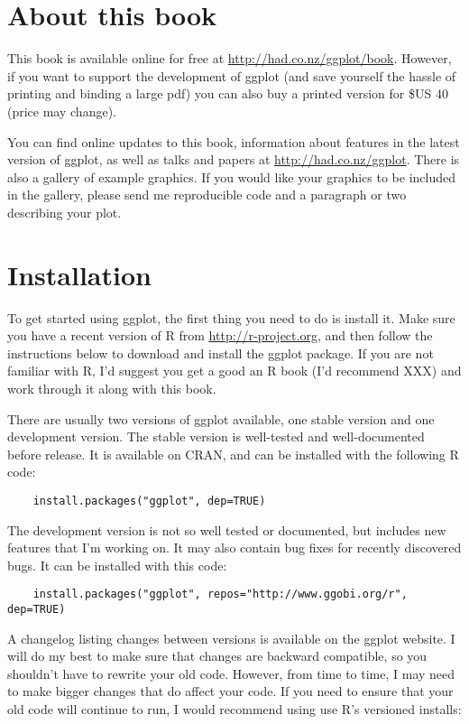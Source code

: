 \section{About this book}\label{sec:about_this_book}

This book is available online for free at \url{http://had.co.nz/ggplot/book}.  However, if you want to support the development of ggplot (and save yourself the hassle of printing and binding a large pdf) you can also buy a printed version for \$US 40 (price may change).  

You can find online updates to this book, information about features in the latest version of ggplot, as well as talks and papers at \url{http://had.co.nz/ggplot}.  There is also a gallery of example graphics.  If you would like your graphics to be included in the gallery, please send me reproducible code and a paragraph or two describing your plot.

\section{Installation}\label{sub:installation}

To get started using ggplot, the first thing you need to do is install it.  Make sure you have a recent version of R from \url{http://r-project.org}, and then follow the instructions below to download and install the ggplot package.  If you are not familiar with R, I'd suggest you get a good an R book (I'd recommend XXX) and work through it along with this book.

There are usually two versions of ggplot available, one stable version and one development version. The stable version is well-tested and well-documented before release.  It is available on CRAN, and can be installed with the following R code:

\begin{verbatim}
	install.packages("ggplot", dep=TRUE)
\end{verbatim}

The development version is not so well tested or documented, but includes new features that I'm working on.  It may also contain bug fixes for recently discovered bugs.  It can be installed with this code:

\begin{verbatim}
	install.packages("ggplot", repos="http://www.ggobi.org/r", dep=TRUE)
\end{verbatim}

A changelog listing changes between versions is available on the ggplot website.  I will do my best to make sure that changes are backward compatible, so you shouldn't have to rewrite your old code.  However, from time to time, I may need to make bigger changes that do affect your code.  If you need to ensure that your old code will continue to run, I would recommend using use R's versioned installs:

